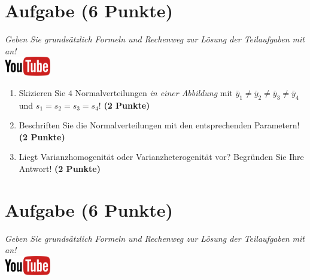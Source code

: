\documentclass[a4paper, 10pt]{scrartcl}\usepackage[]{graphicx}\usepackage[]{xcolor}
\begin{document}
 
\clearpage

\section{Aufgabe \hfill (6 Punkte)}

\textit{Geben Sie grunds{\"a}tzlich Formeln und Rechenweg zur L{\"o}sung der
  Teilaufgaben mit an!} \\[1Ex]

\hfill\href{https://youtu.be/ZrJhn2wPbq4}{\includegraphics[width =
  2cm]{img/youtube}}\\[1Ex]



\begin{enumerate}
\item Skizieren Sie $4$ Normalverteilungen \textit{in einer
    Abbildung} mit $\bar{y}_1 \neq \bar{y}_2 \neq \bar{y}_3 \neq \bar{y}_4$ und $s_1 = s_2 = s_3 = s_4$! \textbf{(2 Punkte)}
\item Beschriften Sie die Normalverteilungen mit den entsprechenden
  Parametern! \textbf{(2 Punkte)}
\item Liegt Varianzhomogenit{\"a}t oder Varianzheterogenit{\"a}t vor? Begr{\"u}nden Sie
  Ihre Antwort! \textbf{(2 Punkte)}
\end{enumerate}

 
\clearpage

\section{Aufgabe \hfill (6 Punkte)}

\textit{Geben Sie grunds{\"a}tzlich Formeln und Rechenweg zur L{\"o}sung der
  Teilaufgaben mit an!} \\[1Ex]

\hfill\href{https://youtu.be/aXvxGC4YLqk}{\includegraphics[width =
  2cm]{img/youtube}}\\[1Ex]
\end{document}

